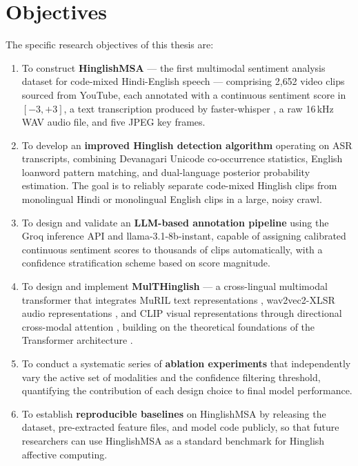 \section{Objectives}

The specific research objectives of this thesis are:

\begin{enumerate}
    \item To construct \textbf{HinglishMSA} --- the first multimodal sentiment analysis dataset for code-mixed Hindi-English speech --- comprising 2{,}652 video clips sourced from YouTube, each annotated with a continuous sentiment score in $[-3,+3]$, a text transcription produced by faster-whisper \cite{radford2023whisper}, a raw 16\,kHz WAV audio file, and five JPEG key frames.

    \item To develop an \textbf{improved Hinglish detection algorithm} operating on ASR transcripts, combining Devanagari Unicode co-occurrence statistics, English loanword pattern matching, and dual-language posterior probability estimation. The goal is to reliably separate code-mixed Hinglish clips from monolingual Hindi or monolingual English clips in a large, noisy crawl.

    \item To design and validate an \textbf{LLM-based annotation pipeline} using the Groq inference API and llama-3.1-8b-instant, capable of assigning calibrated continuous sentiment scores to thousands of clips automatically, with a confidence stratification scheme based on score magnitude.

    \item To design and implement \textbf{MulTHinglish} --- a cross-lingual multimodal transformer that integrates MuRIL text representations \cite{khanuja2021muril}, wav2vec2-XLSR audio representations \cite{conneau2021xlsr}, and CLIP visual representations \cite{radford2021clip} through directional cross-modal attention \cite{tsai2019multimodal}, building on the theoretical foundations of the Transformer architecture \cite{vaswani2017attention}.

    \item To conduct a systematic series of \textbf{ablation experiments} that independently vary the active set of modalities and the confidence filtering threshold, quantifying the contribution of each design choice to final model performance.

    \item To establish \textbf{reproducible baselines} on HinglishMSA by releasing the dataset, pre-extracted feature files, and model code publicly, so that future researchers can use HinglishMSA as a standard benchmark for Hinglish affective computing.
\end{enumerate}

